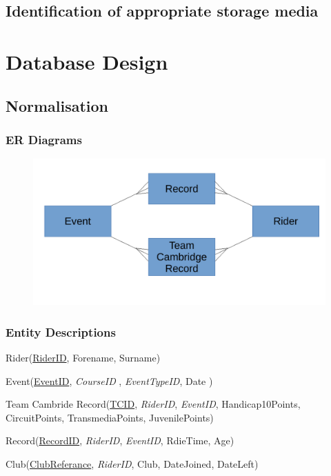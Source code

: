 \subsection{Identification of appropriate storage media}

\section{Database Design}

\subsection{Normalisation}

\subsubsection{ER Diagrams}
\begin{figure}[H]
    \includegraphics[width=\textwidth]{./ER/ERDesing.pdf}
\end{figure}

\subsubsection{Entity Descriptions}

Rider(\underline{RiderID}, Forename, Surname)

Event(\underline{EventID}, \emph{CourseID} , \emph{EventTypeID}, Date )

Team Cambride Record(\underline{TCID}, \emph{RiderID}, \emph{EventID}, Handicap10Points, CircuitPoints, TransmediaPoints, JuvenilePoints)

Record(\underline{RecordID}, \emph{RiderID}, \emph{EventID}, RdieTime, Age)

Club(\underline{ClubReferance}, \emph{RiderID}, Club, DateJoined, DateLeft)

